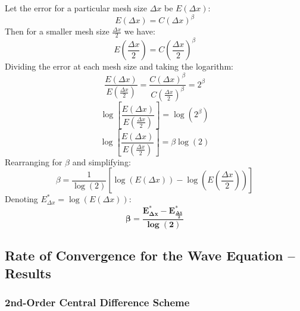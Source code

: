 \documentclass[10pt]{article}		%
\numberwithin{equation}{section}
\begin{document}
Let the error for a particular mesh size $\Delta x$ be $E\left(\Delta x\right)$:
\begin{equation}
E\left(\Delta x\right) = C\left(\Delta x\right)^\beta
\end{equation}
Then for a smaller mesh size $\frac{\Delta x}{2}$ we have:
\begin{equation}
E\left(\frac{\Delta x}{2}\right) = C\left(\frac{\Delta x}{2}\right)^\beta
\end{equation}
Dividing the error at each mesh size and taking the logarithm:
\begin{equation}
\frac{E\left(\Delta x\right)}{E\left(\frac{\Delta x}{2}\right)} = \frac{C\left(\Delta x\right)^\beta}{C\left(\frac{\Delta x}{2}\right)^\beta} = 2^\beta
\end{equation}
\begin{equation}
\log\left[\frac{E\left(\Delta x\right)}{E\left(\frac{\Delta x}{2}\right)}\right] = \log(2^\beta)
\end{equation}
\begin{equation}
\log\left[\frac{E\left(\Delta x\right)}{E\left(\frac{\Delta x}{2}\right)}\right] = \beta \log(2)
\end{equation}
Rearranging for $\beta$ and simplifying:
\begin{equation}
\beta = \frac{1}{\log(2)} \left[\log\left(E\left(\Delta x\right)\right) - \log\left(E\left(\frac{\Delta x}{2}\right)\right)\right] 
\end{equation}
Denoting $E^*_{\Delta x} = \log\left(E\left(\Delta x\right)\right)$:
\begin{equation}
\mathbf{\beta = \frac{E^*_{\Delta x} - E^*_{\frac{\Delta x}{2}}}{\log (2)}}
\end{equation}

\newpage

\subsection{Rate of Convergence for the Wave Equation -- Results}

\subsubsection{2nd-Order Central Difference Scheme}
\end{document}
